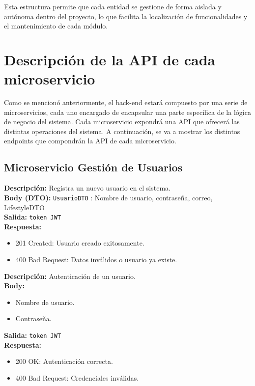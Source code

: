 Esta estructura permite que cada entidad se gestione de forma aislada y autónoma dentro del proyecto, lo que facilita la localización de funcionalidades y el mantenimiento de cada módulo.


\section{Descripción de la API de cada microservicio}
Como se mencionó anteriormente, el back-end estará compuesto por una serie de microservicios, cada uno encargado de encapsular una parte específica de la lógica de negocio del sistema. Cada microservicio expondrá una API que ofrecerá las distintas operaciones del sistema. A continuación, se va a mostrar los distintos endpoints que compondrán la API de cada microservicio.


\subsection{Microservicio Gestión de Usuarios}

\begin{tcolorbox}[colback=blue!5!white, colframe=blue!75!black, title=\texttt{/usuarios/} -- POST]
\textbf{Descripción:} Registra un nuevo usuario en el sistema. \\
\textbf{Body (DTO):} \texttt{UsuarioDTO} : Nombre de usuario, contraseña, correo, LifestyleDTO \\
\textbf{Salida:} \texttt{token JWT} \\
\textbf{Respuesta:}
\begin{itemize}[label=--]
    \item 201 Created: Usuario creado exitosamente.
    \item 400 Bad Request: Datos inválidos o usuario ya existe.
\end{itemize}
\end{tcolorbox}

\vspace{0.5em}

\begin{tcolorbox}[colback=blue!5!white, colframe=blue!75!black, title=\texttt{/usuario/login} -- POST]
\textbf{Descripción:} Autenticación de un usuario. \\
\textbf{Body:}
\begin{itemize}[label=--]
    \item Nombre de usuario.
    \item Contraseña.
\end{itemize}
\textbf{Salida:} \texttt{token JWT} \\
\textbf{Respuesta:}
\begin{itemize}[label=--]
    \item 200 OK: Autenticación correcta.
    \item 400 Bad Request: Credenciales inválidas.
\end{itemize}
\end{tcolorbox}

